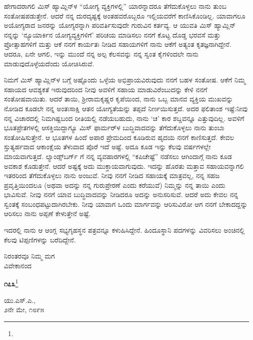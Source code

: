 ಹೇಗಾದರಾಗಲಿ ಮಿಸ್ ಹ್ಯಾಮ್ಲಿನ್‌ಳ “ಯೋಗ್ಯ ವ್ಯಕ್ತಿಗಳಲ್ಲಿ” ಯಾರನ್ನಾದರೂ ತೆಗೆದುಕೊಳ್ಳಲು ನಾನು ತುಂಬ ಸಂತೋಷಪಡುತ್ತೇನೆ. ಆದರೆ ನನ್ನ ದುರದೃಷ್ಟಕ್ಕೆ ಅಂತಹವರೊಬ್ಬರೂ ಇಲ್ಲಿಯವರೆಗೆ ಕಾಣಿಸಿಕೊಂಡಿಲ್ಲ. ಯಾವಾಗಲೂ ಅಯೋಗ್ಯರಾದ ಜನರನ್ನು ಯೋಗ್ಯರನ್ನಾಗಿ ಪರಿವರ್ತಿಸುವುದೇ ಗುರುವಿನ ಕರ್ತವ್ಯ. ಆ ಯುವತಿ ಮಿಸ್ ಹ್ಯಾಮ್ಲಿನ್ ನನ್ನನ್ನು ‘ನ್ಯೂಯಾರ್ಕಿನ ಯೋಗ್ಯವ್ಯಕ್ತಿಗಳಿಗೆ’ ಪರಿಚಯ ಮಾಡಿಸಲು ನನಗೆ ಕೊಟ್ಟ ದೊಡ್ಡ ಭರವಸೆ ಮತ್ತು ಪ್ರೋತ್ಸಾಹಗಳಿಗೆ ಮತ್ತು ಆಕೆ ನನಗೆ ಕಾರ್ಯತಃ ನೀಡಿದ ಸಹಾಯಗಳಿಗೆ ನಾನು ಆಕೆಗೆ ಅತ್ಯಂತ ಕೃತಜ್ಞನಾಗಿದ್ದೇನೆ. ಆದರೂ, ಏನೇ ಆಗಲಿ, ಇನ್ನು ಮುಂದೆ ನನ್ನ ಅಲ್ಪ ಕೆಲಸವನ್ನು ನನ್ನ ಸ್ವಂತ ಕೈಗಳಿಂದಲೇ ನಾನು ಮಾಡುವುದೊಳ್ಳೆಯದೆಂದು ಯೋಚಿಸಿರುವೆ.

ನಿಮಗೆ ಮಿಸ್ ಹ್ಯಾಮ್ಲಿನ್‌ಳ ಬಗ್ಗೆ ಅಷ್ಟೊಂದು ಒಳ್ಳೆಯ ಅಭಿಪ್ರಾಯವಿರುವುದು ನನಗೆ ಬಹಳ ಸಂತೋಷ. ಆಕೆಗೆ ನಿಮ್ಮ ಸಹಾಯದ ಆವಶ್ಯಕತೆ ಇರುವುದರಿಂದ ನೀವು ಅವಳಿಗೆ ಸಹಾಯ ಮಾಡುವಿರೆಂಬುದನ್ನು ಕೇಳಿ ನನಗೆ ಸಂತೋಷವಾಯಿತು. ಆದರೆ ತಾಯಿ, ಶ‍್ರೀರಾಮಕೃಷ್ಣರ ಕೃಪೆಯಿಂದ, ನಾನು ಒಬ್ಬ ಮಾನವ ವ್ಯಕ್ತಿಯ ಮುಖವನ್ನು ನೋಡಿದ ಕೂಡಲೇ ನನ್ನ ಅಂತಃಸಾಕ್ಷಿ ಆತನ ಯೋಗ್ಯತೆಯನ್ನು ತಪ್ಪದೆ ನಿರ್ಣಯಿಸುತ್ತದೆ. ಅದರ ಫಲಿತಾಂಶ ಇಷ್ಟೆ:ನೀವು ನನ್ನ ವಿಚಾರದಲ್ಲಿ ನಿಮಗಿಷ್ಟಬಂದ ರೀತಿಯಲ್ಲಿ ನಡೆಯಬಹುದು, ನಾನು ‘ಚ’ ಕಾರ ಶಬ್ದವನ್ನೂ ಎತ್ತುವುದಿಲ್ಲ. ಅವಳಿಗೆ ಭೂತಪ್ರೇತಗಳಲ್ಲಿ ಆಸಕ್ತಿಯಿದ್ದಾಗ್ಯೂ ಮಿಸ್ ಫಾರ್ಮರ್‌ಳ ಬುದ್ಧಿವಾದವನ್ನು ತೆಗೆದುಕೊಳ್ಳಲು ನಾನು ತುಂಬಾ ಸಂತೋಷಿಸುತ್ತೇನೆ. ಆ ಭೂತಗಳ ಹಿಂದೆ ಅಪಾರ ಪ್ರೇಮದಿಂದ ಕೂಡಿರುವ ಹೃದಯ ನನಗೆ ಕಾಣಿಸುತ್ತದೆ. ಕೇವಲ ಸ್ತುತ್ಯರ್ಹವಾದ ಆಕಾಂಕ್ಷೆಯ ತೆಳುವಾದ ಪೊರೆ ಇದೆ ಅಷ್ಟೆ. ಅದೂ ಕೂಡ ಇನ್ನು ಕೆಲವು ವರ್ಷಗಳಲ್ಲೇ ಮಾಯವಾಗುತ್ತದೆ. ಲ್ಯಾಂಡ್ಸ್‌ಬರ್ಗ್ ಗೆ ನನ್ನ ವ್ಯವಹಾರಗಳಲ್ಲಿ “ಕಪಿಚೇಷ್ಟೆ” ನಡೆಸಲು ಆಗಿಂದಾಗ್ಗೆ ನಾನು ಕೂಡ ಅವಕಾಶ ಕೊಡುತ್ತೇನೆ. ಆದರೆ ಅಷ್ಟಕ್ಕೆ ಅದು ಮುಕ್ತಾಯವಾಗುವುದು. ಇದನ್ನು ಹೊರತು ಮತ್ತಾವ ಸಹಾಯವನ್ನಾಗಲಿ ಇತರರಿಂದ ತೆಗೆದುಕೊಳ್ಳಲು ನಾನು ಅಂಜುವೆ. ನೀವು ನನಗೆ ನೀಡಿದ ಸಹಾಯಕ್ಕೆ ಮಾತ್ರವಲ್ಲ, ನನ್ನ ಸಹಜ ಪ್ರವೃತ್ತಿಯಿಂದಲೂ (ಅಥವಾ ಅದನ್ನು ನನ್ನ ಗುರುಪ್ರೇರಣೆ ಎಂದು ಕರೆಯುವೆ) ನಿಮ್ಮನ್ನು ನನ್ನ ತಾಯಿ ಎಂದು ಭಾವಿಸುವೆ. ನೀವು ನನಗೆ ಯಾವ ಬುದ್ಧಿವಾದವನ್ನು ನೀಡಿದರೂ ಅದನ್ನು ಅನುಸರಿಸುವೆ. ಆದರೆ ಅದು ಕೇವಲ ನನ್ನ ಸ್ವಂತಕ್ಕೆ ಸಂಬಂಧಪಟ್ಟುದಾಗಿರಬೇಕು. ನೀವು ಯಾವಾಗ ಒಂದು ಮಾರ್ಗವನ್ನು ಆರಿಸುವಿರೋ ಆಗ ನನಗೆ ಬೇಕಾದದ್ದನ್ನು ಆರಿಸಲು ನಾನು ಅಪ್ಪಣೆ ಕೇಳುತ್ತೇನೆ ಅಷ್ಟೆ.

ಇದರಲ್ಲಿ ನಾನು ಆ ಆಂಗ್ಲ ಸಭ್ಯಗೃಹಸ್ಥನ ಪತ್ರವನ್ನೂ ಕಳುಹಿಸಿದ್ದೇನೆ. ಹಿಂದೂಸ್ಥಾನಿ ಪದಗಳನ್ನು ವಿವರಿಸಲು ಅಂಚಿನಲ್ಲಿ ಕೆಲವು ಟಿಪ್ಪಣಿಗಳನ್ನು ಬರೆದಿದ್ದೇನೆ.

\vspace{-0.4cm}

{\flushright
ನಿರಂತರವೂ ನಿಮ್ಮ ಮಗ\\ವಿವೇಕಾನಂದ\par}

\begin{center}
\textbf{೧೭೩}\footnote{}
\end{center}

\begin{flushright}
ಯು.ಎಸ್.ಎ.,\\೨ನೇ ಮೇ, ೧೮೯೫
\end{flushright}

